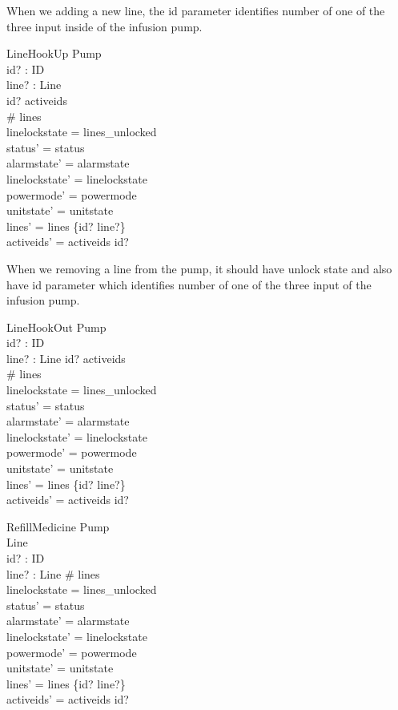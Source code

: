 \documentclass{article}
\begin{document}
	When we adding a new line, the id parameter identifies number of 
	one of the three input inside of the infusion pump.

	\begin{schema}{LineHookUp}
		\Delta Pump \\
		id? : ID \\
		line? : Line \\
	\where
		id? \notin activeids \\
		\# lines  \\
		linelockstate = lines\_unlocked \\
		status' = status \\
		alarmstate' = alarmstate \\
		linelockstate' = linelockstate \\
		powermode' =  powermode \\
		unitstate' = unitstate \\
		lines' = lines \cup \{id? \mapsto line?\} \\
		activeids' = activeids \cup id?
	\end{schema}

	When we removing a line from the pump, it should have unlock state
	and also have id parameter which identifies number of one of the
	three input of the infusion pump.
	
	\begin{schema}{LineHookOut}
		\Delta Pump \\
		id? : ID \\
		line? : Line
	\where
		id? \in activeids \\
		\# lines  \\
		linelockstate = lines_unlocked \\
		status' = status \\
		alarmstate' = alarmstate \\
		linelockstate' = linelockstate \\
		powermode' =  powermode \\
		unitstate' = unitstate \\
		lines' = lines \setminus \{id? \mapsto line?\} \\
		activeids' = activeids \setminus id?
	\end{schema}
	
	\begin{schema}{RefillMedicine}
		\Delta Pump \\
		\Delta Line \\
		id? : ID \\
		line? : Line
	\where
		\# lines  \\
		linelockstate = lines_unlocked \\
		status' = status \\
		alarmstate' = alarmstate \\
		linelockstate' = linelockstate \\
		powermode' =  powermode \\
		unitstate' = unitstate \\
		lines' = lines \setminus \{id? \mapsto line?\} \\
		activeids' = activeids \setminus id?
	\end{schema}
	
\end{document}
